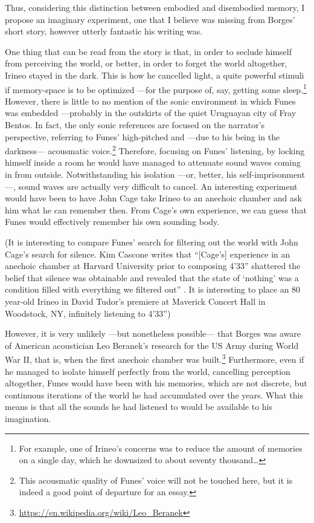 Thus, considering this distinction between embodied and disembodied memory, I propose an imaginary experiment, one that I believe was missing from Borges' short story, however utterly fantastic his writing was. 

One thing that can be read from the story is that, in order to seclude himself from perceiving the world, or better, in order to forget the world altogether, Irineo stayed in the dark. This is how he cancelled light, a quite powerful stimuli if memory-space is to be optimized ---for the purpose of, say, getting some sleep.\footnote{For example, one of Irineo's concerns was to reduce the amount of memories on a single day, which he downsized to about seventy thousand\dots} However, there is little to no mention of the sonic environment in which Funes was embedded ---probably in the outskirts of the quiet Uruguayan city of Fray Bentos. In fact, the only sonic references are focused on the narrator's perspective, referring to Funes' high-pitched and ---due to his being in the darkness--- acousmatic voice.\footnote{This acousmatic quality of Funes' voice will not be touched here, but it is indeed a good point of departure for an essay.} Therefore, focusing on Funes' listening, by locking himself inside a room he would have managed to attenuate sound waves coming in from outside. Notwithstanding his isolation ---or, better, his self-imprisonment---, sound waves are actually very difficult to cancel. An interesting experiment would have been to have John Cage take Irineo to an anechoic chamber and ask him what he can remember then. From Cage's own experience, we can guess that Funes would effectively remember his own sounding body.

(It is interesting to compare Funes' search for filtering out the world with John Cage's search for silence. Kim Cascone writes that ``[Cage's] experience in an anechoic chamber at Harvard University prior to composing 4'33'' shattered the belief that silence was obtainable and revealed that the state of `nothing' was a condition filled with everything we filtered out'' \parencite[14]{Cas00:The}. It is interesting to place an 80 year-old Irineo in David Tudor's premiere at Maverick Concert Hall in Woodstock, NY, infinitely listening to 4'33'')

However, it is very unlikely ---but nonetheless possible--- that Borges was aware of American acoustician Leo Beranek's research for the US Army during World War II, that is, when the first anechoic chamber was built.\footnote{\url{https://en.wikipedia.org/wiki/Leo_Beranek}} Furthermore, even if he managed to isolate himself perfectly from the world, cancelling perception altogether, Funes would have been with his memories, which are not discrete, but continuous iterations of the world he had accumulated over the years. What this means is that all the sounds he had listened to would be available to his imagination.

